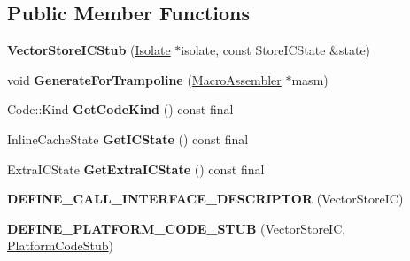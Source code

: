 \subsection*{Public Member Functions}
\begin{DoxyCompactItemize}
\item 
{\bfseries Vector\+Store\+I\+C\+Stub} (\hyperlink{classv8_1_1internal_1_1_isolate}{Isolate} $\ast$isolate, const Store\+I\+C\+State \&state)\hypertarget{classv8_1_1internal_1_1_vector_store_i_c_stub_a4f1e4bbeb44545b0f973297e59e57ce5}{}\label{classv8_1_1internal_1_1_vector_store_i_c_stub_a4f1e4bbeb44545b0f973297e59e57ce5}

\item 
void {\bfseries Generate\+For\+Trampoline} (\hyperlink{classv8_1_1internal_1_1_macro_assembler}{Macro\+Assembler} $\ast$masm)\hypertarget{classv8_1_1internal_1_1_vector_store_i_c_stub_a079a4d90c48837a367d13a70e9d1f911}{}\label{classv8_1_1internal_1_1_vector_store_i_c_stub_a079a4d90c48837a367d13a70e9d1f911}

\item 
Code\+::\+Kind {\bfseries Get\+Code\+Kind} () const  final\hypertarget{classv8_1_1internal_1_1_vector_store_i_c_stub_a50422c1201e6bbc99c60ef8c252e9cb7}{}\label{classv8_1_1internal_1_1_vector_store_i_c_stub_a50422c1201e6bbc99c60ef8c252e9cb7}

\item 
Inline\+Cache\+State {\bfseries Get\+I\+C\+State} () const  final\hypertarget{classv8_1_1internal_1_1_vector_store_i_c_stub_a0eb7c108e403172edc7e96609f2d2902}{}\label{classv8_1_1internal_1_1_vector_store_i_c_stub_a0eb7c108e403172edc7e96609f2d2902}

\item 
Extra\+I\+C\+State {\bfseries Get\+Extra\+I\+C\+State} () const  final\hypertarget{classv8_1_1internal_1_1_vector_store_i_c_stub_ab9d480e2e0bb48d6b1cc44bc95ccb78c}{}\label{classv8_1_1internal_1_1_vector_store_i_c_stub_ab9d480e2e0bb48d6b1cc44bc95ccb78c}

\item 
{\bfseries D\+E\+F\+I\+N\+E\+\_\+\+C\+A\+L\+L\+\_\+\+I\+N\+T\+E\+R\+F\+A\+C\+E\+\_\+\+D\+E\+S\+C\+R\+I\+P\+T\+OR} (Vector\+Store\+IC)\hypertarget{classv8_1_1internal_1_1_vector_store_i_c_stub_aed69c18ed5be18ce3f32b64e9370ac9d}{}\label{classv8_1_1internal_1_1_vector_store_i_c_stub_aed69c18ed5be18ce3f32b64e9370ac9d}

\item 
{\bfseries D\+E\+F\+I\+N\+E\+\_\+\+P\+L\+A\+T\+F\+O\+R\+M\+\_\+\+C\+O\+D\+E\+\_\+\+S\+T\+UB} (Vector\+Store\+IC, \hyperlink{classv8_1_1internal_1_1_platform_code_stub}{Platform\+Code\+Stub})\hypertarget{classv8_1_1internal_1_1_vector_store_i_c_stub_a5eb39c34479754c10173508ca2943766}{}\label{classv8_1_1internal_1_1_vector_store_i_c_stub_a5eb39c34479754c10173508ca2943766}

\end{DoxyCompactItemize}
